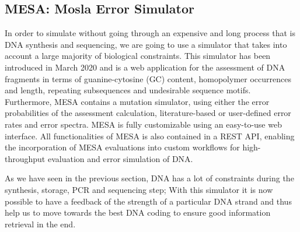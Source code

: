 \subsection{MESA: Mosla Error Simulator}

In order to simulate without going through an expensive and long process that is DNA synthesis and sequencing, we are going to use a simulator that takes into account a large majority of biological constraints.
This simulator has been introduced \cite{bib:10.1093/bioinformatics/btaa140} in March 2020 and is a web application for the assessment of DNA fragments in terms of guanine-cytosine (GC) content, homopolymer occurrences and length, repeating subsequences and undesirable sequence motifs.
Furthermore, MESA contains a mutation simulator, using either the error probabilities of the assessment calculation, literature-based or user-defined error rates and error spectra. MESA is fully customizable using an easy-to-use web interface. All functionalities of MESA is also contained in a REST API, enabling the incorporation of MESA evaluations into custom workflows for high-throughput evaluation and error simulation of DNA.

As we have seen in the previous section, DNA has a lot of constraints during the synthesis, storage, PCR and sequencing step; With this simulator it is now possible to have a feedback of the strength of a particular DNA strand and thus help us to move towards the best DNA coding to ensure good information retrieval in the end.

